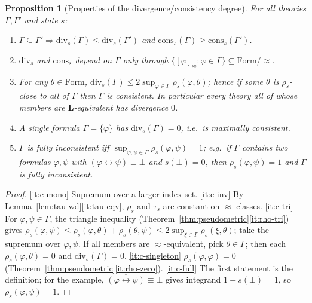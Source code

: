 \documentclass{amsart}
\theoremstyle{definition}
\theoremstyle{plain}
\newtheorem{proposition}{Proposition}
\newcommand{\bL}{\mathbf{L}}
\newcommand{\Form}{\mathrm{Form}}
\newcommand{\fbi}{\leftrightarrow}
\newcommand{\Bot}{\bot}
\begin{document}
\begin{proposition}[Properties of the divergence/consistency degree]\label{prop:cons}
For all theories $\Gamma,\Gamma'$ and state $s$:
\begin{enumerate}
\item\label{it:c-mono} $\Gamma\subseteq\Gamma'\Rightarrow
\mathrm{div}_s(\Gamma)\le\mathrm{div}_s(\Gamma')$ and
$\mathrm{cons}_s(\Gamma)\ge\mathrm{cons}_s(\Gamma')$.
\item\label{it:c-inv} $\mathrm{div}_s$ and $\mathrm{cons}_s$ depend on $\Gamma$ only
through $\{[\varphi]_\approx:\varphi\in\Gamma\}\subseteq\Form/{\approx}$.
\item\label{it:c-tri} For any $\theta\in\Form$,
$\mathrm{div}_s(\Gamma)\le 2\sup_{\varphi\in\Gamma}\rho_s(\varphi,\theta)$;
hence if some $\theta$ is $\rho_s$-close to all of $\Gamma$ then $\Gamma$ is
consistent.  In particular every theory all of whose members are
$\bL$-equivalent has divergence $0$.
\item\label{it:c-singleton} A single formula $\Gamma=\{\varphi\}$ has
$\mathrm{div}_s(\Gamma)=0$, i.e.\ is maximally consistent.
\item\label{it:c-full} $\Gamma$ is fully inconsistent iff
$\sup_{\varphi,\psi\in\Gamma}\rho_s(\varphi,\psi)=1$; e.g.\ if $\Gamma$ contains
two formulas $\varphi,\psi$ with $\overline{(\varphi\fbi\psi)}\equiv\Bot$ and
$s(\Bot)=0$, then $\rho_s(\varphi,\psi)=1$ and $\Gamma$ is fully inconsistent.
\end{enumerate}
\end{proposition}

\begin{proof}
\eqref{it:c-mono} Supremum over a larger index set.
\eqref{it:c-inv} By Lemma~\ref{lem:tau-wd}\eqref{it:tau-eqv}, $\rho_s$ and
$\tau_s$ are constant on $\approx$-classes.
\eqref{it:c-tri} For $\varphi,\psi\in\Gamma$, the triangle inequality
(Theorem~\ref{thm:pseudometric}\eqref{it:rho-tri}) gives
$\rho_s(\varphi,\psi)\le\rho_s(\varphi,\theta)+\rho_s(\theta,\psi)\le
2\sup_{\xi\in\Gamma}\rho_s(\xi,\theta)$; take the supremum over $\varphi,\psi$.
If all members are $\approx$-equivalent, pick $\theta\in\Gamma$; then each
$\rho_s(\varphi,\theta)=0$ and $\mathrm{div}_s(\Gamma)=0$.
\eqref{it:c-singleton} $\rho_s(\varphi,\varphi)=0$
(Theorem~\ref{thm:pseudometric}\eqref{it:rho-zero}).
\eqref{it:c-full} The first statement is the definition; for the example,
$\overline{(\varphi\fbi\psi)}\equiv\Bot$ gives integrand $1-s(\Bot)=1$, so
$\rho_s(\varphi,\psi)=1$.
\end{proof}
\end{document}
